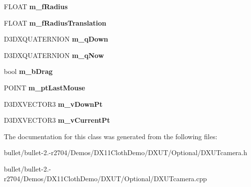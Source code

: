 \begin{DoxyCompactItemize}
\item 
\hypertarget{class_c_d3_d_arc_ball_a11401fa5425ecaab3669745a4c20e552}{F\+L\+O\+A\+T {\bfseries m\+\_\+f\+Radius}}\label{class_c_d3_d_arc_ball_a11401fa5425ecaab3669745a4c20e552}

\item 
\hypertarget{class_c_d3_d_arc_ball_a4600c8ffe537118ba7b8f7fdc60c9322}{F\+L\+O\+A\+T {\bfseries m\+\_\+f\+Radius\+Translation}}\label{class_c_d3_d_arc_ball_a4600c8ffe537118ba7b8f7fdc60c9322}

\item 
\hypertarget{class_c_d3_d_arc_ball_a944bbe7cbea8e5c715b1c62a0a6ba32f}{D3\+D\+X\+Q\+U\+A\+T\+E\+R\+N\+I\+O\+N {\bfseries m\+\_\+q\+Down}}\label{class_c_d3_d_arc_ball_a944bbe7cbea8e5c715b1c62a0a6ba32f}

\item 
\hypertarget{class_c_d3_d_arc_ball_a248db3d61e41f65195810367bbe849f1}{D3\+D\+X\+Q\+U\+A\+T\+E\+R\+N\+I\+O\+N {\bfseries m\+\_\+q\+Now}}\label{class_c_d3_d_arc_ball_a248db3d61e41f65195810367bbe849f1}

\item 
\hypertarget{class_c_d3_d_arc_ball_a437b55976f4fe81a6f294a2d1f11ac81}{bool {\bfseries m\+\_\+b\+Drag}}\label{class_c_d3_d_arc_ball_a437b55976f4fe81a6f294a2d1f11ac81}

\item 
\hypertarget{class_c_d3_d_arc_ball_ae4114109f3ae6ae749748210b54405ad}{P\+O\+I\+N\+T {\bfseries m\+\_\+pt\+Last\+Mouse}}\label{class_c_d3_d_arc_ball_ae4114109f3ae6ae749748210b54405ad}

\item 
\hypertarget{class_c_d3_d_arc_ball_a702ae593d9a99c473c33bc762b6034de}{D3\+D\+X\+V\+E\+C\+T\+O\+R3 {\bfseries m\+\_\+v\+Down\+Pt}}\label{class_c_d3_d_arc_ball_a702ae593d9a99c473c33bc762b6034de}

\item 
\hypertarget{class_c_d3_d_arc_ball_a759c768375a12e49cfdad6d141e60d21}{D3\+D\+X\+V\+E\+C\+T\+O\+R3 {\bfseries m\+\_\+v\+Current\+Pt}}\label{class_c_d3_d_arc_ball_a759c768375a12e49cfdad6d141e60d21}

\end{DoxyCompactItemize}


The documentation for this class was generated from the following files\+:\begin{DoxyCompactItemize}
\item 
bullet/bullet-\/2.-\/r2704/\+Demos/\+D\+X11\+Cloth\+Demo/\+D\+X\+U\+T/\+Optional/D\+X\+U\+Tcamera.\+h\item 
bullet/bullet-\/2.-\/r2704/\+Demos/\+D\+X11\+Cloth\+Demo/\+D\+X\+U\+T/\+Optional/D\+X\+U\+Tcamera.\+cpp\end{DoxyCompactItemize}
